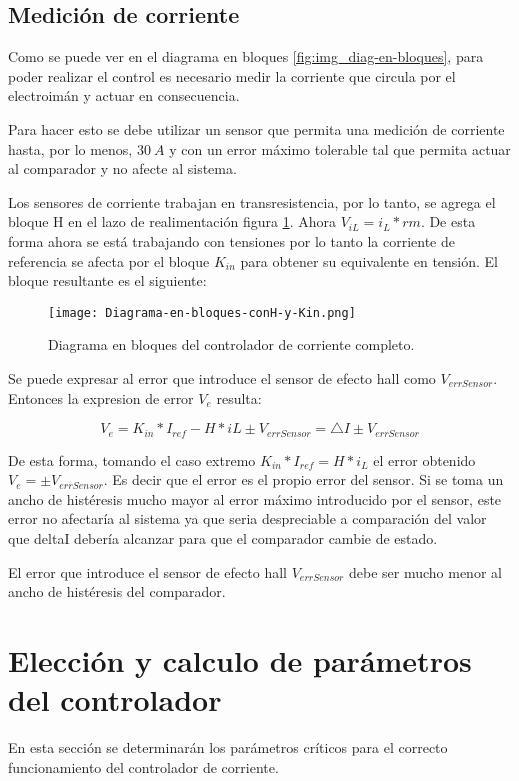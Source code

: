 \subsection{Medición de corriente}


Como se puede ver en el diagrama en bloques \ref{fig:img_diag-en-bloques}, para poder realizar el control es necesario medir la corriente que circula por el electroimán y actuar en consecuencia.


Para hacer esto se debe utilizar un sensor que permita una medición de corriente hasta, por lo menos, $30\:A$  y con un error máximo tolerable tal que permita actuar al comparador y no afecte al sistema.

Los sensores de corriente trabajan en transresistencia, por lo tanto, se agrega el bloque H en el lazo de realimentación figura \ref{fig:img_diag-en-bloques-conH-y-Kin}. Ahora $V_{iL}=i_{L}*rm$. De esta forma ahora se está trabajando con tensiones por lo tanto la corriente de referencia se afecta por el bloque $K_{in}$ para obtener su equivalente en tensión. El bloque resultante es el siguiente:

\begin{figure}[H]
	\centering
	\texttt{[image: Diagrama-en-bloques-conH-y-Kin.png]}
	\caption{Diagrama en bloques del controlador de corriente completo.}
	\label{fig:img_diag-en-bloques-conH-y-Kin}
\end{figure}

Se puede expresar al error que introduce el sensor de efecto hall como $V_{errSensor}$. Entonces la expresion de error $V_{e}$ resulta: 

\begin{equation}\label{eq_error_ve}
	V_{e}= K_{in}*I_{ref}-H*iL\pm V_{errSensor}=\triangle I \pm V_{errSensor}
\end{equation}


De esta forma, tomando el  caso extremo $K_{in}*I_{ref}=H*i_{L}$ el error obtenido $V_{e}=\pm V_{errSensor}$.
Es decir que el error es el propio error del sensor. Si se toma un ancho de histéresis mucho mayor al error máximo introducido por el sensor, este error no afectaría al sistema ya que seria despreciable a comparación del valor que deltaI debería alcanzar para que el comparador cambie de estado.

El error que introduce el sensor de efecto hall $V_{errSensor}$ debe ser mucho menor al ancho de histéresis del comparador.

\section{Elección y calculo de parámetros del controlador}
En esta sección se determinarán los parámetros críticos para el correcto funcionamiento del controlador de corriente.
